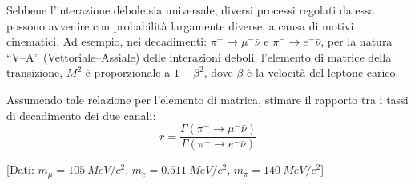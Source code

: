 \begin{Exercise}[title={Soppressione cinematica nel decadimento $\beta$}]
  Sebbene l'interazione debole sia universale, diversi processi
  regolati da essa possono avvenire con probabilit\`a largamente
  diverse, a causa di motivi cinematici. Ad esempio, nei decadimenti:
  $\pi^- \to \mu^-\bar \nu$ e $\pi^- \to e^-\bar \nu$, per la natura
  ``V--A'' (Vettoriale--Assiale) delle interazioni deboli, l'elemento
  di matrice della transizione, $M^2$ \`e proporzionale a $1-\beta^2$,
  dove $\beta$ \`e la velocit\`a del leptone carico.

  \Question Assumendo tale relazione per l'elemento di matrica,
  stimare il rapporto tra i tassi di decadimento dei due canali:
  \[
  r = \frac{\Gamma(\pi^- \to \mu^-\bar \nu)}{\Gamma(\pi^- \to e^-\bar \nu)}
  \]

  [Dati: $m_\mu = \SI{105}{MeV/c^2}$, $m_e = \SI{0.511}{MeV/c^2}$, $m_\pi = \SI{140}{MeV/c^2}$]
\end{Exercise}
